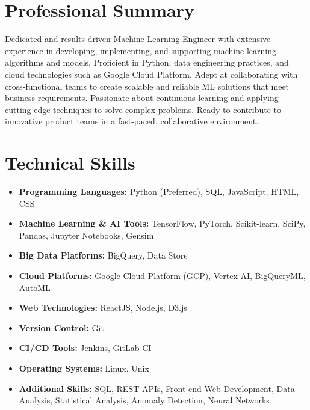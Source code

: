 \documentclass[a4paper,10pt]{moderncv}
\begin{document}
\makecvtitle

\section{Professional Summary}
Dedicated and results-driven Machine Learning Engineer with extensive experience in developing, implementing, and supporting machine learning algorithms and models. Proficient in Python, data engineering practices, and cloud technologies such as Google Cloud Platform. Adept at collaborating with cross-functional teams to create scalable and reliable ML solutions that meet business requirements. Passionate about continuous learning and applying cutting-edge techniques to solve complex problems. Ready to contribute to innovative product teams in a fast-paced, collaborative environment.

\section{Technical Skills}
\begin{itemize}
    \item \textbf{Programming Languages:} Python (Preferred), SQL, JavaScript, HTML, CSS
    \item \textbf{Machine Learning \& AI Tools:} TensorFlow, PyTorch, Scikit-learn, SciPy, Pandas, Jupyter Notebooks, Gensim
    \item \textbf{Big Data Platforms:} BigQuery, Data Store
    \item \textbf{Cloud Platforms:} Google Cloud Platform (GCP), Vertex AI, BigQueryML, AutoML
    \item \textbf{Web Technologies:} ReactJS, Node.js, D3.js
    \item \textbf{Version Control:} Git
    \item \textbf{CI/CD Tools:} Jenkins, GitLab CI
    \item \textbf{Operating Systems:} Linux, Unix
    \item \textbf{Additional Skills:} SQL, REST APIs, Front-end Web Development, Data Analysis, Statistical Analysis, Anomaly Detection, Neural Networks
\end{itemize}
\end{document}
